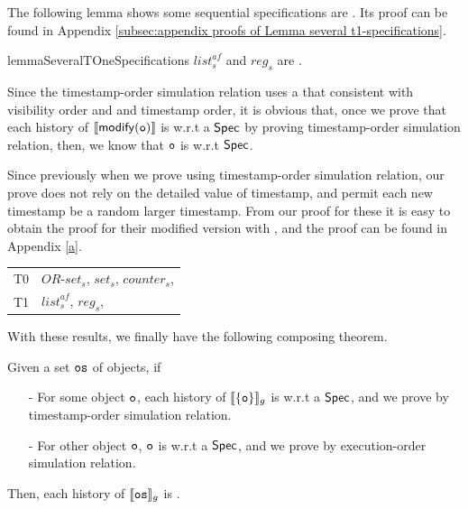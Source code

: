 The following lemma shows some sequential specifications are \tonespec{}. Its proof can be found in Appendix \ref{subsec:appendix proofs of Lemma several t1-specifications}.

\begin{restatable}{lemma}{SeveralTOneSpecifications}
\label{lemma:several t1-specifications}
$\mathit{list}_s^{\mathit{af}}$ and $\mathit{reg}_s$ are \tonespec{}.
\end{restatable}

Since the timestamp-order simulation relation uses a \crdtlinearization that consistent with visibility order and and timestamp order, it is obvious that, once we prove that each history of $\llbracket \mathsf{modify}(\mathtt{o}) \rrbracket$ is \crdtlinearizable{} w.r.t a \tonespec{} $\mathsf{Spec}$ by proving timestamp-order simulation relation, then, we know that $\mathtt{o}$ is \tonelinearizable w.r.t $\mathsf{Spec}$.

Since previously when we prove \crdtimp using timestamp-order simulation relation, our prove does not rely on the detailed value of timestamp, and permit each new timestamp be a random larger timestamp. From our proof for these \crdtimp it is easy to obtain the proof for their modified version with \gts{}, and the proof can be found in Appendix \ref{a}.



\begin{table}
  \centering
  \begin{tabular}[t]{l|l}
    T0 & $\mathit{OR}$-$\mathit{set}_s$, $\mathit{set}_s$, $\mathit{counter}_s$,  \\
    T1 & $\mathit{list}_s^{\mathit{af}}$, $\mathit{reg}_s$,
  \end{tabular}
\end{table}

With these results, we finally have the following composing theorem.

\begin{theorem}
\label{definition:compositional theorem}
Given a set $\mathtt{os}$ of objects, if

\begin{itemize}
\setlength{\itemsep}{0.5pt}
\item[-] For some object $\mathtt{o}$, each history of $\llbracket \{ \mathtt{o} \} \rrbracket_g$ is \crdtlinearizable{} w.r.t a \tonespec{} $\mathsf{Spec}$, and we prove by timestamp-order simulation relation.

\item[-] For other object $\mathtt{o}$, $\mathtt{o}$ is \crdtlinearizable{} w.r.t a \tzerospec{} $\mathsf{Spec}$, and we prove by execution-order simulation relation.
\end{itemize}

Then, each history of $\llbracket \mathtt{os} \rrbracket_g$ is \crdtlinearizable{}.
\end{theorem}




